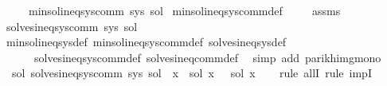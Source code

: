 \begin{isabellebody}
\ \ \ \ \ {\isachardoublequoteopen}min{\isacharunderscore}{\kern0pt}sol{\isacharunderscore}{\kern0pt}ineq{\isacharunderscore}{\kern0pt}sys{\isacharunderscore}{\kern0pt}comm\ sys\ sol{\isachardoublequoteclose}\isanewline
%
\isadelimproof
%
\endisadelimproof
%
\isatagproof
{}\isamarkupfalse%
\ min{\isacharunderscore}{\kern0pt}sol{\isacharunderscore}{\kern0pt}ineq{\isacharunderscore}{\kern0pt}sys{\isacharunderscore}{\kern0pt}comm{\isacharunderscore}{\kern0pt}def\ \isamarkupfalse%
\isanewline
\ \ \isamarkupfalse%
\ assms\ \isamarkupfalse%
\ {\isachardoublequoteopen}solves{\isacharunderscore}{\kern0pt}ineq{\isacharunderscore}{\kern0pt}sys{\isacharunderscore}{\kern0pt}comm\ sys\ sol{\isachardoublequoteclose}\isanewline
\ \ \ \ \isamarkupfalse%
\ min{\isacharunderscore}{\kern0pt}sol{\isacharunderscore}{\kern0pt}ineq{\isacharunderscore}{\kern0pt}sys{\isacharunderscore}{\kern0pt}def\ min{\isacharunderscore}{\kern0pt}sol{\isacharunderscore}{\kern0pt}ineq{\isacharunderscore}{\kern0pt}sys{\isacharunderscore}{\kern0pt}comm{\isacharunderscore}{\kern0pt}def\ solves{\isacharunderscore}{\kern0pt}ineq{\isacharunderscore}{\kern0pt}sys{\isacharunderscore}{\kern0pt}def\isanewline
\ \ \ \ \ \ solves{\isacharunderscore}{\kern0pt}ineq{\isacharunderscore}{\kern0pt}sys{\isacharunderscore}{\kern0pt}comm{\isacharunderscore}{\kern0pt}def\ solves{\isacharunderscore}{\kern0pt}ineq{\isacharunderscore}{\kern0pt}comm{\isacharunderscore}{\kern0pt}def\ \isamarkupfalse%
\ {\isacharparenleft}{\kern0pt}simp\ add{\isacharcolon}{\kern0pt}\ parikh{\isacharunderscore}{\kern0pt}img{\isacharunderscore}{\kern0pt}mono{\isacharparenright}{\kern0pt}\isanewline
\ \ \isamarkupfalse%
\ {\isachardoublequoteopen}\ {\isasymforall}sol{\isacharprime}{\kern0pt}{\isachardot}{\kern0pt}\ solves{\isacharunderscore}{\kern0pt}ineq{\isacharunderscore}{\kern0pt}sys{\isacharunderscore}{\kern0pt}comm\ sys\ sol{\isacharprime}{\kern0pt}\ {\isasymlongrightarrow}\ {\isacharparenleft}{\kern0pt}{\isasymforall}x{\isachardot}{\kern0pt}\ {\isasymPsi}\ {\isacharparenleft}{\kern0pt}sol\ x{\isacharparenright}{\kern0pt}\ {\isasymsubseteq}\ {\isasymPsi}\ {\isacharparenleft}{\kern0pt}sol{\isacharprime}{\kern0pt}\ x{\isacharparenright}{\kern0pt}{\isacharparenright}{\kern0pt}{\isachardoublequoteclose}\isanewline
\ \ \isamarkupfalse%
\ {\isacharparenleft}{\kern0pt}rule\ allI{\isacharcomma}{\kern0pt}\ rule\ impI{\isacharparenright}{\kern0pt}\isanewline

\end{isabellebody}
